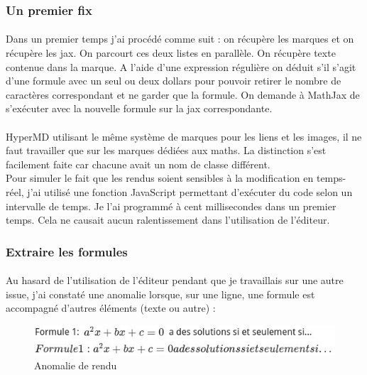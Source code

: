 \documentclass[12pt]{article}
\begin{document}
\subsubsection{Un premier fix}
\paragraph{}
Dans un premier temps j'ai procédé comme suit : on récupère les marques et on récupère les jax. On parcourt ces deux listes en parallèle. On récupère texte contenue dans la marque. A l'aide d'une expression régulière on déduit s'il s'agit d'une formule avec un seul ou deux dollars pour pouvoir retirer le nombre de caractères correspondant et ne garder que la formule. On demande à MathJax de s'exécuter avec la nouvelle formule sur la jax correspondante.
\paragraph{}
HyperMD utilisant le même système de marques pour les liens et les images, il ne faut travailler que sur les marques dédiées aux maths. La distinction s'est facilement faite car chacune avait un nom de classe différent.\\
Pour simuler le fait que les rendus soient sensibles à la modification en temps-réel, j'ai utilisé une fonction JavaScript permettant d'exécuter du code selon un intervalle de temps. Je l'ai programmé à cent millisecondes dans un premier temps. Cela ne causait aucun ralentissement dans l'utilisation de l'éditeur.\\

\subsubsection{Extraire les formules}
\paragraph{}
Au hasard de l'utilisation de l'éditeur pendant que je travaillais sur une autre issue, j'ai constaté une anomalie lorsque, sur une ligne, une formule est accompagné d'autres éléments (texte ou autre) :

\begin{figure}[H]
    \centering
    \includegraphics[scale=0.9]{gallery/whole_line.jpg}
    \caption[nom dans le sommaire]{Anomalie de rendu}
    \label{fig:gallery6}
\end{figure}
\end{document}
